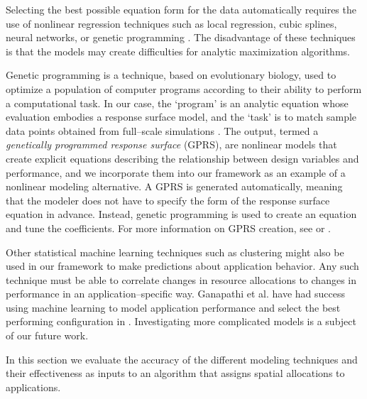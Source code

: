 Selecting the best possible equation form for the data automatically requires the use of nonlinear regression techniques such as local regression, cubic splines, neural networks, or genetic programming \cite{alvarez-thesis, bodik-acdc09, wasserman-book}.  The disadvantage of these techniques is that the models may create difficulties for analytic maximization algorithms.

Genetic programming is a technique, based on evolutionary biology, used to optimize a population of computer programs according to their ability to perform a computational task. In our case, the `program' is an analytic equation whose evaluation embodies a response surface model, and the `task' is to match sample data points obtained from full--scale simulations \cite{alvarez-thesis}. The output, termed a
{\em genetically programmed response surface} (GPRS), are nonlinear models that create explicit equations describing the relationship between design variables and performance, and we incorporate them into our framework as an example of a nonlinear modeling alternative.
A GPRS is generated automatically, meaning that the modeler does not have to specify the form of the response surface equation in advance. Instead, genetic programming \cite{koza} is used to create an equation and tune the coefficients.  For more information on GPRS creation, see \cite{alvarez-thesis} or \cite{cook-dac08}.

Other statistical machine learning techniques such as clustering might also be used in our framework to make predictions about application behavior.  Any such technique must be able to correlate changes in resource allocations to changes in performance in an application--specific way.  Ganapathi et al. have had success using machine learning to model application performance and select the best performing configuration in \cite{Archana}. Investigating more complicated models is a subject of our future work.


In this section we evaluate the accuracy of the different modeling techniques and their effectiveness as inputs to an algorithm that assigns spatial allocations to applications.

